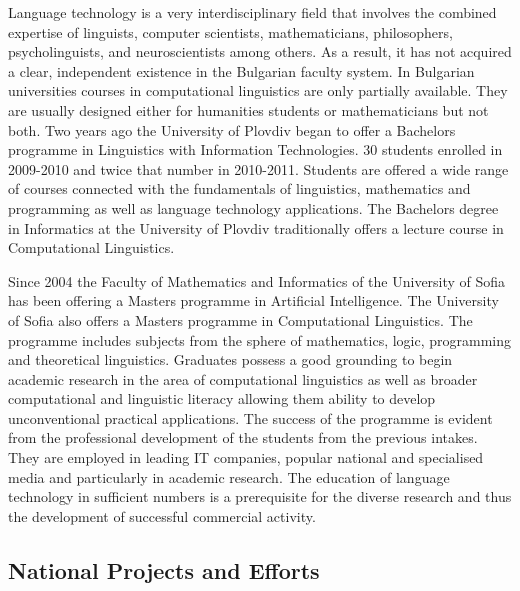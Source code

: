 \begin{multicols}{2}
Language technology is a very interdisciplinary field that involves the combined expertise of linguists, computer scientists, mathematicians, philosophers, psycholinguists, and neuroscientists among others. As a result, it has not acquired a clear, independent existence in the Bulgarian faculty system. In Bulgarian universities courses in computational linguistics are only partially available. They are usually designed either for humanities students or mathematicians but not both. Two years ago the University of Plovdiv began to offer a Bachelors programme in Linguistics with Information Technologies. 30 students enrolled in 2009-2010 and twice that number in 2010-2011. Students are offered a wide range of courses connected with the fundamentals of linguistics, mathematics and programming as well as language technology applications. The Bachelors degree in Informatics at the University of Plovdiv traditionally offers a lecture course in Computational Linguistics. 

Since 2004 the Faculty of Mathematics and Informatics of the University of Sofia has been offering a Masters programme in Artificial Intelligence. The University of Sofia also offers a Masters programme in Computational Linguistics. The programme includes subjects from the sphere of mathematics, logic, programming and theoretical linguistics. Graduates possess a good grounding to begin academic research in the area of computational linguistics as well as broader computational and linguistic literacy allowing them ability to develop unconventional practical applications. The success of the programme is evident from the professional development of the students from the previous intakes. They are employed in leading IT companies, popular national and specialised media and particularly in academic research.
The education of language technology in sufficient numbers is a prerequisite for the diverse research and thus the development of successful commercial activity.

\subsection{National Projects and Efforts}




\end{multicols}
